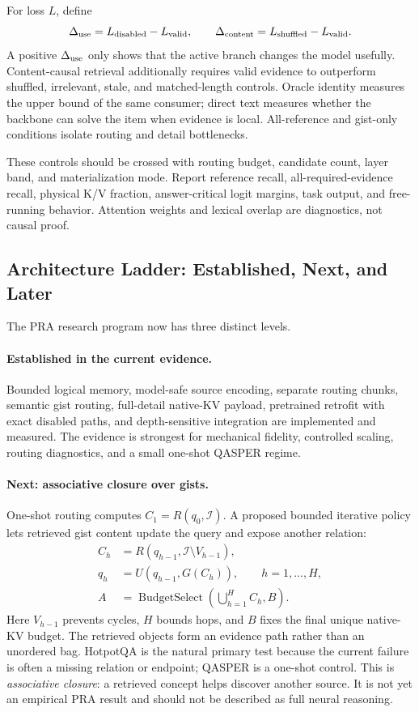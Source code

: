 For loss $L$, define
\begin{equation}
\Delta_{\rm use}=L_{\rm disabled}-L_{\rm valid},\qquad
\Delta_{\rm content}=L_{\rm shuffled}-L_{\rm valid}.
\end{equation}
A positive $\Delta_{\rm use}$ only shows that the active branch changes the model usefully.
Content-causal retrieval additionally requires valid evidence to outperform shuffled,
irrelevant, stale, and matched-length controls. Oracle identity measures the upper bound of
the same consumer; direct text measures whether the backbone can solve the item when evidence
is local. All-reference and gist-only conditions isolate routing and detail bottlenecks.

These controls should be crossed with routing budget, candidate count, layer band, and
materialization mode. Report reference recall, all-required-evidence recall, physical K/V
fraction, answer-critical logit margins, task output, and free-running behavior. Attention
weights and lexical overlap are diagnostics, not causal proof.

\subsection{Architecture Ladder: Established, Next, and Later}

The PRA research program now has three distinct levels.

\paragraph{Established in the current evidence.}
Bounded logical memory, model-safe source encoding, separate routing chunks, semantic gist
routing, full-detail native-KV payload, pretrained retrofit with exact disabled paths, and
depth-sensitive integration are implemented and measured. The evidence is strongest for
mechanical fidelity, controlled scaling, routing diagnostics, and a small one-shot QASPER
regime.

\paragraph{Next: associative closure over gists.}
One-shot routing computes $C_1=R(q_0,\mathcal I)$. A proposed bounded iterative policy lets
retrieved gist content update the query and expose another relation:
\begin{align}
C_h &= R(q_{h-1},\mathcal I\setminus V_{h-1}),\\
q_h &= U(q_{h-1},G(C_h)),\qquad h=1,\ldots,H,\\
A &= \operatorname{BudgetSelect}\!\left(\bigcup_{h=1}^{H}C_h,B\right).
\end{align}
Here $V_{h-1}$ prevents cycles, $H$ bounds hops, and $B$ fixes the final unique native-KV
budget. The retrieved objects form an evidence path rather than an unordered bag. HotpotQA is
the natural primary test because the current failure is often a missing relation or endpoint;
QASPER is a one-shot control. This is \emph{associative closure}: a retrieved concept helps
discover another source. It is not yet an empirical PRA result and should not be described as
full neural reasoning.

